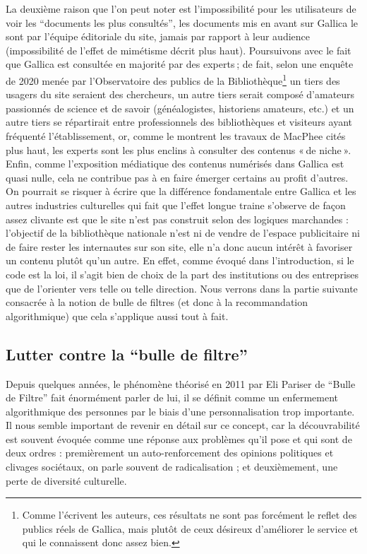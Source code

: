 La deuxième raison que l’on peut noter est l’impossibilité pour les utilisateurs de voir les \enquote{documents les plus consultés}, les documents mis en avant sur Gallica le sont par l’équipe éditoriale du site, jamais par rapport à leur audience (impossibilité de l’effet de mimétisme décrit plus haut). Poursuivons avec le fait que Gallica est consultée en majorité par des experts ; de fait, selon une enquête de 2020 menée par l’Observatoire des publics de la Bibliothèque\footnote{ Comme l’écrivent les auteurs, ces résultats ne sont pas forcément le reflet des publics réels de Gallica, mais plutôt de ceux désireux d’améliorer le service et qui le connaissent donc assez bien.} un tiers des usagers du site seraient des chercheurs, un autre tiers serait composé d’amateurs passionnés de science et de savoir (généalogistes, historiens amateurs, etc.) et un autre tiers se répartirait entre professionnels des bibliothèques et visiteurs ayant fréquenté l’établissement, or, comme le montrent les travaux de MacPhee cités plus haut, les experts sont les plus enclins à consulter des contenus « de niche ». Enfin, comme l’exposition médiatique des contenus numérisés dans Gallica est quasi nulle, cela ne contribue pas à en faire émerger certains au profit d’autres. On pourrait se risquer à écrire que la différence fondamentale entre Gallica et les autres industries culturelles qui fait que l’effet longue traine s’observe de façon assez clivante est que le site n’est pas construit selon des logiques marchandes : l’objectif de la bibliothèque nationale n’est ni de vendre de l’espace publicitaire ni de faire rester les internautes sur son site, elle n’a donc aucun intérêt à favoriser un contenu plutôt qu’un autre. En effet, comme évoqué dans l’introduction, si le code est la loi, il s’agit bien de choix de la part des institutions ou des entreprises que de l’orienter vers telle ou telle direction. Nous verrons dans la partie suivante consacrée à la notion de bulle de filtres (et donc à la recommandation algorithmique) que cela s’applique aussi tout à fait.

\subsection{Lutter contre la \enquote{bulle de filtre}}


Depuis quelques années, le phénomène théorisé en 2011 par Eli Pariser de \enquote{Bulle de Filtre} fait énormément parler de lui, il se définit comme un enfermement algorithmique des personnes par le biais d’une personnalisation trop importante. Il nous semble important de revenir en détail sur ce concept, car la découvrabilité est souvent évoquée comme une réponse aux problèmes qu’il pose et qui sont de deux ordres : premièrement un auto-renforcement des opinions politiques et clivages sociétaux, on parle souvent de radicalisation ; et deuxièmement, une perte de diversité culturelle.

